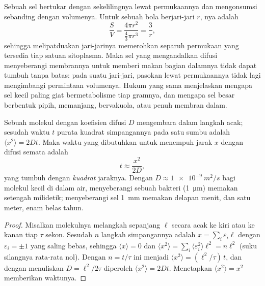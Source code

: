\begin{proposition}\label{prop:b2:unicellular-diversity:surface}
Sebuah sel bertukar dengan sekelilingnya lewat permukaannya dan
mengonsumsi sebanding dengan volumenya. Untuk sebuah bola berjari-jari
$r$, \emph{}nya adalah
\[
\frac{S}{V} = \frac{4\pi r^2}{\tfrac{4}{3}\pi r^3} = \frac{3}{r},
\]
sehingga melipatduakan jari-jarinya memerohkan separuh permukaan yang
tersedia tiap satuan sitoplasma. Maka sel yang mengandalkan difusi
menyeberangi membrannya untuk memberi makan bagian dalamnya tidak dapat
tumbuh tanpa batas: pada suatu jari-jari, pasokan lewat permukaannya
tidak lagi mengimbangi permintaan volumenya. Hukum yang sama
menjelaskan mengapa sel kecil paling giat bermetabolisme tiap gramnya,
dan mengapa sel besar berbentuk pipih, memanjang, bervakuola, atau
penuh membran dalam.
\end{proposition}

\begin{theorem}\label{thm:b2:unicellular-diversity:diffusion}
Sebuah molekul dengan koefisien difusi $D$ mengembara dalam langkah
acak; sesudah waktu $t$ purata kuadrat simpangannya pada satu sumbu
adalah $\langle x^2\rangle = 2Dt$. Maka waktu yang dibutuhkan untuk
menempuh jarak $x$ dengan difusi semata adalah
\[
t \approx \frac{x^2}{2D},
\]
yang tumbuh dengan \emph{kuadrat} jaraknya. Dengan
$D \approx \qty{1e-9}{m^2/s}$ bagi molekul kecil di dalam air,
menyeberangi sebuah bakteri (\qty{1}{\micro m}) memakan setengah
milidetik; menyeberangi sel \qty{1}{mm} memakan delapan menit, dan satu
meter, enam belas tahun.
\end{theorem}
\begin{proof}
Misalkan molekulnya melangkah sepanjang $\ell$ secara acak ke kiri atau
ke kanan tiap $\tau$ sekon. Sesudah $n$ langkah simpangannya adalah
$x = \sum_i \varepsilon_i \ell$ dengan $\varepsilon_i = \pm 1$ yang
saling bebas, sehingga $\langle x\rangle = 0$ dan $\langle x^2\rangle =
\sum_i \langle\varepsilon_i^2\rangle \ell^2 = n\ell^2$ (suku silangnya
rata-rata nol). Dengan $n = t/\tau$ ini menjadi $\langle x^2\rangle
= (\ell^2/\tau)\,t$, dan dengan menuliskan $D = \ell^2/2\tau$ diperoleh
$\langle x^2\rangle = 2Dt$. Menetapkan $\langle x^2\rangle = x^2$
memberikan waktunya.
\end{proof}

